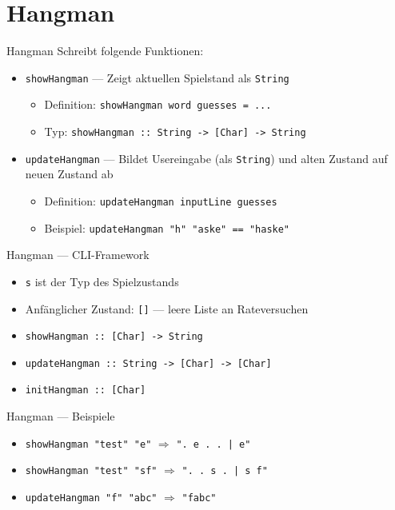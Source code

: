 \documentclass{beamer}
\begin{document}
\section{Hangman}

\begin{frame}{Hangman}
        Schreibt folgende Funktionen:
	\begin{itemize}
		\item \texttt{showHangman} --- Zeigt aktuellen Spielstand als \texttt{String}
		\begin{itemize}
			\item Definition: \texttt{showHangman word guesses = ...}
			\item Typ: \texttt{showHangman :: String -> [Char] -> String}
		\end{itemize}
		\item \texttt{updateHangman} --- Bildet Usereingabe (als \texttt{String}) und alten Zustand auf neuen Zustand ab
		\begin{itemize}
			\item Definition: \texttt{updateHangman inputLine guesses}
			\item Beispiel: \texttt{updateHangman "h" "aske" == "haske"}
		\end{itemize}
	\end{itemize}
\end{frame}

\begin{frame}{Hangman --- CLI-Framework}

	\begin{itemize}
		\item \texttt{s} ist der Typ des Spielzustands
		\item Anfänglicher Zustand: \texttt{[]} --- leere Liste an Rateversuchen
                \item \texttt{showHangman :: [Char] -> String}
		\pause
                \item \texttt{updateHangman :: String -> [Char] -> [Char]}
		\pause
                \item \texttt{initHangman :: [Char]}
	\end{itemize}
\end{frame}

\begin{frame}{Hangman --- Beispiele}
	\begin{itemize}
          \item \texttt{showHangman "{}test"{} "{}e"{}} $\Rightarrow$ \texttt{"{}. e . . | e"{}}
          \item \texttt{showHangman "{}test"{} "{}sf"{}} $\Rightarrow$ \texttt{"{}. . s . | s f"{}}
          \item \texttt{updateHangman "{}f"{} "{}abc"{}} $\Rightarrow$ \texttt{"{}fabc"{}}
	\end{itemize}
\end{frame}
\end{document}
